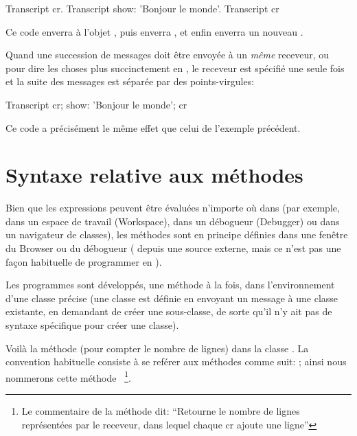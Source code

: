 \documentclass[a4paper,10pt,twoside]{book}
\begin{document}
\begin{code}{}
Transcript cr.
Transcript show: 'Bonjour le monde'.
Transcript cr
\end{code}

\noindent
Ce code enverra  \`{a} l'objet , puis
enverra  , et enfin enverra un nouveau .

Quand une succession de messages doit \^{e}tre envoy\'{e}e \`{a} un \emph{m\^{e}me} receveur, 
ou pour dire les choses plus succinctement en , le receveur est sp\'{e}cifi\'{e} une seule fois et la suite des messages est s\'{e}par\'{e}e par des points-virgules:

\begin{code}{}
Transcript cr;
    show: 'Bonjour le monde';
    cr
\end{code}
Ce code a pr\'{e}cis\'{e}ment le m\^{e}me effet que celui de l'exemple pr\'{e}c\'{e}dent.


\section{Syntaxe relative aux m\'{e}thodes}
Bien que les expressions peuvent \^{e}tre \'{e}valu\'{e}es n'importe
o\`{u} dans \pharo (par exemple, dans un espace de travail (Workspace),
dans un d\'{e}bogueur (Debugger) ou dans un navigateur de classes), 
les m\'{e}thodes sont en principe d\'{e}finies dans une fen\^{e}tre du
Browser ou du d\'{e}bogueur
( %
depuis une source externe, mais ce n'est pas une fa\c{c}on habituelle de programmer en \pharo).

Les programmes sont d\'{e}velopp\'{e}s, une m\'{e}thode \`{a} la fois,
dans l'environnement d'une classe pr\'{e}cise (une classe est d\'{e}finie en envoyant un message \`{a} une classe existante, en demandant de cr\'{e}er une sous-classe, de sorte qu'il n'y ait pas de syntaxe sp\'{e}cifique pour cr\'{e}er une classe).

Voil\`{a} la m\'{e}thode  (pour compter le
nombre de lignes) dans la classe  .
La convention habituelle consiste à se ref\'{e}rer aux m\'{e}thodes
comme suit: ; ainsi nous nommerons cette
m\'{e}thode ~\footnote{Le commentaire de la
  m\'ethode dit: 
``Retourne le nombre de lignes représentées par le receveur, dans
    lequel chaque cr ajoute une ligne''}.
\end{document}
